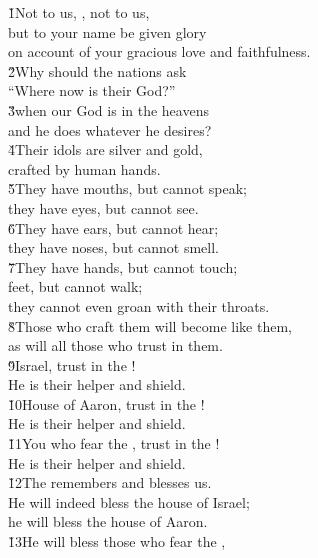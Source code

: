 \begin{poetry}
\poeml \v{1}Not to us, , not to us, \\
\poemll    but to your name be given glory \\
\poemll    on account of your gracious love and faithfulness. \\
\poeml \v{2}Why should the nations ask \\
\poemll    ``Where now is their God?'' \\
\poeml \v{3}when our God is in the heavens \\
\poemll    and he does whatever he desires? \\
\poeml \v{4}Their idols are silver and gold, \\
\poemll    crafted by human hands. \\
\poeml \v{5}They have mouths, but cannot speak; \\
\poemll    they have eyes, but cannot see. \\
\poeml \v{6}They have ears, but cannot hear; \\
\poemll    they have noses, but cannot smell. \\
\poeml \v{7}They have hands, but cannot touch; \\
\poemll    feet, but cannot walk; \\
\poemlll       they cannot even groan with their throats. \\
\poeml \v{8}Those who craft them will become like them, \\
\poemll    as will all those who trust in them. \\
\poeml \v{9}Israel, trust in the ! \\
\poemll    He is their helper and shield. \\
\poeml \v{10}House of Aaron, trust in the ! \\
\poemll    He is their helper and shield. \\
\poeml \v{11}You who fear the , trust in the ! \\
\poemll    He is their helper and shield. \\
\poeml \v{12}The  remembers and blesses us. \\
\poemll    He will indeed bless the house of Israel; \\
\poemlll       he will bless the house of Aaron. \\
\poeml \v{13}He will bless those who fear the , \\

\end{poetry}
